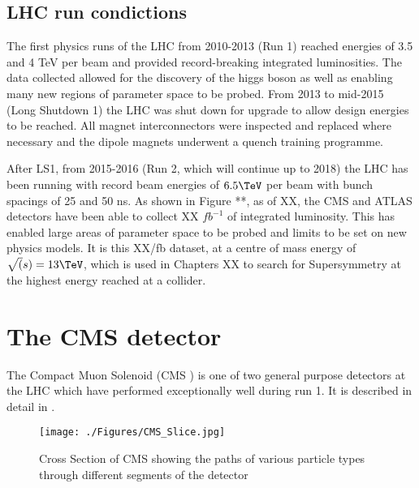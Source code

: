 
\subsection{LHC run condictions}

The first physics runs of the LHC from 2010-2013 (Run 1) reached energies of 3.5 and 4 TeV per beam and 
provided record-breaking integrated luminosities. The data collected allowed 
for the discovery of the higgs boson\cite{higgs} as well as enabling many new regions of parameter space
to be probed. From 2013 to mid-2015 (Long Shutdown 1) the LHC was shut down for upgrade to allow design
energies to be reached. All magnet interconnectors were inspected and replaced where necessary 
and the dipole magnets underwent a quench training programme. 

After LS1, from 2015-2016 (Run 2, which will continue up to 2018) the LHC has been running with record beam energies 
of $6.5\TeV$ per beam with bunch spacings of 25 and 50 ns. 
As shown in Figure **, as of XX, the CMS and ATLAS detectors have been able to collect XX $fb^{-1}$ of integrated luminosity. 
This has enabled large areas of parameter space to be probed and limits to be set on new physics models. It is this 
XX/fb dataset, at a centre of mass energy of $\sqrt(s) = 13\TeV$, which is used in Chapters XX to search for Supersymmetry at the highest energy reached at a collider.


\section{The CMS detector}
The Compact Muon Solenoid (CMS \cite{CMSTDR}) is one of two general purpose detectors at the LHC 
which have performed exceptionally well during run 1. It is described in detail in \cite{CMS}. 

\begin{figure}
\centering
    \texttt{[image: ./Figures/CMS\_Slice.jpg]}
  \caption{Cross Section of CMS showing the paths of various particle types 
  through different segments of the detector \cite{cmsslice}}
  \label{CMS_SLICE}
\end{figure}

